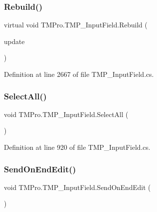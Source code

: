 \subsubsection{\texorpdfstring{Rebuild()}{Rebuild()}}
{\footnotesize\ttfamily virtual void T\+M\+Pro.\+T\+M\+P\+\_\+\+Input\+Field.\+Rebuild (\begin{DoxyParamCaption}\item[{Canvas\+Update}]{update }\end{DoxyParamCaption})\hspace{0.3cm}{\ttfamily [virtual]}}



Definition at line 2667 of file T\+M\+P\+\_\+\+Input\+Field.\+cs.

\mbox{\label{class_t_m_pro_1_1_t_m_p___input_field_ae7246b94a4be46fb34a132db2cbcbf98}} 
\subsubsection{\texorpdfstring{SelectAll()}{SelectAll()}}
{\footnotesize\ttfamily void T\+M\+Pro.\+T\+M\+P\+\_\+\+Input\+Field.\+Select\+All (\begin{DoxyParamCaption}{ }\end{DoxyParamCaption})\hspace{0.3cm}{\ttfamily [protected]}}



Definition at line 920 of file T\+M\+P\+\_\+\+Input\+Field.\+cs.

\mbox{\label{class_t_m_pro_1_1_t_m_p___input_field_adba4a85e3c7777a5573ed2ff139e4517}} 
\subsubsection{\texorpdfstring{SendOnEndEdit()}{SendOnEndEdit()}}
{\footnotesize\ttfamily void T\+M\+Pro.\+T\+M\+P\+\_\+\+Input\+Field.\+Send\+On\+End\+Edit (\begin{DoxyParamCaption}{ }\end{DoxyParamCaption})\hspace{0.3cm}{\ttfamily [protected]}}



